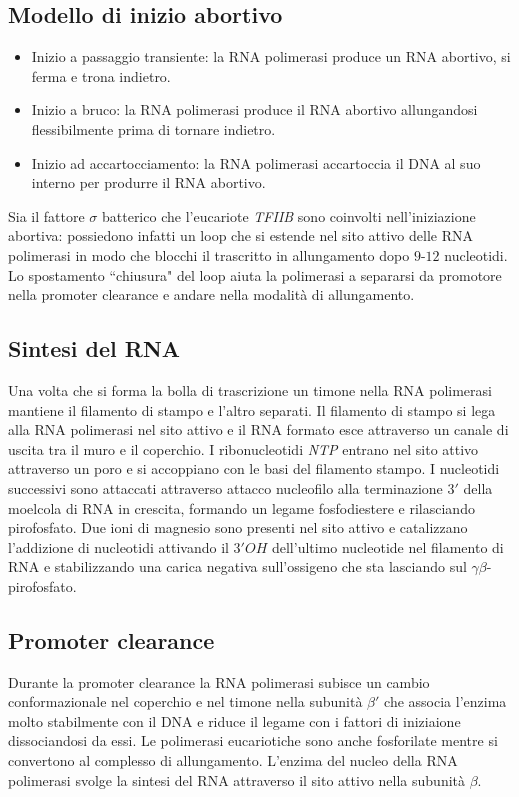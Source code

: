 \subsection{Modello di inizio abortivo}
\begin{itemize}
	\item Inizio a passaggio transiente: la RNA polimerasi produce un RNA abortivo, si ferma e trona indietro.
	\item Inizio a bruco: la RNA polimerasi produce il RNA abortivo allungandosi flessibilmente prima di tornare indietro.
	\item Inizio ad accartocciamento: la RNA polimerasi accartoccia il DNA al suo interno per produrre il RNA abortivo. 
\end{itemize}
Sia il fattore $\sigma$ batterico che l'eucariote \emph{TFIIB} sono coinvolti nell'iniziazione abortiva: possiedono infatti un loop che si estende nel sito attivo delle RNA polimerasi in
modo che blocchi il trascritto in allungamento dopo $9$-$12$ nucleotidi. Lo spostamento ``chiusura" del loop aiuta la polimerasi a separarsi da promotore nella promoter clearance e
andare nella modalit\`a di allungamento. 
\subsection{Sintesi del RNA}
Una volta che si forma la bolla di trascrizione un timone nella RNA polimerasi mantiene il filamento di stampo e l'altro separati. Il filamento di stampo si lega alla RNA polimerasi nel 
sito attivo e il RNA formato esce attraverso un canale di uscita tra il muro e il coperchio. I ribonucleotidi \emph{NTP} entrano nel sito attivo attraverso un poro e si accoppiano con le 
basi del filamento stampo. I nucleotidi successivi sono attaccati attraverso attacco nucleofilo alla terminazione $3'$ della moelcola di RNA in crescita, formando un legame fosfodiestere
e rilasciando pirofosfato. Due ioni di magnesio sono presenti nel sito attivo e catalizzano l'addizione di nucleotidi attivando il $3'OH$ dell'ultimo nucleotide nel filamento di RNA e 
stabilizzando una carica negativa sull'ossigeno che sta lasciando sul $\gamma\beta$-pirofosfato. 
\subsection{Promoter clearance}
Durante la promoter clearance la RNA polimerasi subisce un cambio conformazionale nel coperchio e nel timone nella subunit\`a $\beta'$ che associa l'enzima molto stabilmente con il DNA
e riduce il legame con i fattori di iniziaione dissociandosi da essi. Le polimerasi eucariotiche sono anche fosforilate mentre si convertono al complesso di allungamento. L'enzima del
nucleo della RNA polimerasi svolge la sintesi del RNA attraverso il sito attivo nella subunit\`a $\beta$.
